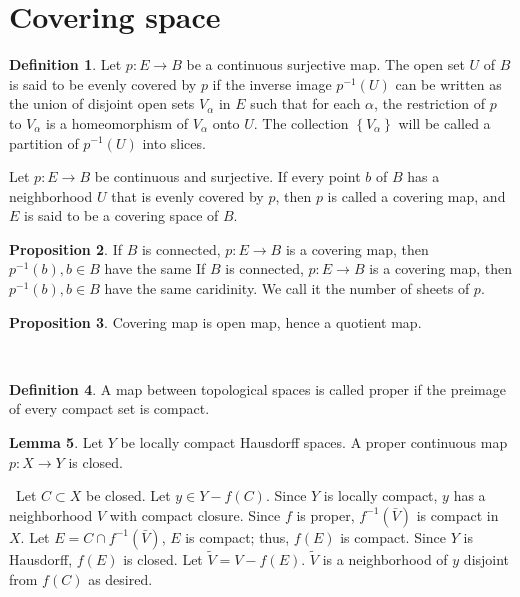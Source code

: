\documentclass[12pt,a4paper]{book}
\newenvironment{prooff}{{\noindent\it\textcolor{cyan!40!black}{Proof}:}\,}{\par}
\theoremstyle{definition}
\newtheorem{defn}{Definition}[section]
\newtheorem{lem}[defn]{Lemma}
\newtheorem{prop}[defn]{Proposition}
\begin{document}
\section{Covering space}
\begin{defn}
    Let $p: E \rightarrow B$ be a continuous surjective map. The open set $U$ of $B$ is said to be evenly covered by $p$ if the inverse image $p^{-1}(U)$ can be written as the union of disjoint open sets $V_\alpha$ in $E$ such that for each $\alpha$, the restriction of $p$ to $V_\alpha$ is a homeomorphism of $V_\alpha$ onto $U$. The collection $\left\{V_\alpha\right\}$ will be called a partition of $p^{-1}(U)$ into slices.

    Let $p: E \rightarrow B$ be continuous and surjective. If every point $b$ of $B$ has a neighborhood $U$ that is evenly covered by $p$, then $p$ is called a covering map, and $E$ is said to be a covering space of $B$.
\end{defn}
\begin{prop}
    If $B$ is connected, $p:E\rightarrow B$ is a covering map, then $p^{-1}(b),b\in B$ have the same  If $B$ is connected, $p:E\rightarrow B$ is a covering map, then $p^{-1}(b),b\in B$ have the same caridinity. We call it the number of sheets of $p$.
\end{prop}
\begin{prop}
    Covering map is open map, hence a quotient map.
\end{prop}
\begin{prooff}

\end{prooff}
\begin{defn}
    A map between topological spaces is called proper if the preimage of every compact set is compact.
\end{defn}
\begin{lem}
    Let $Y$ be locally compact Hausdorff spaces. A proper continuous map $p: X \rightarrow Y$ is closed.
    \label{lemma:proper continuous, closed}
\end{lem}
\begin{prooff}
    Let $C \subset X$ be closed. Let $y \in Y-f(C)$.
    Since $Y$ is locally compact, $y$ has a neighborhood $V$ with compact closure.
    Since $f$ is proper, $f^{-1}(\bar{V})$ is compact in $X$.
    Let $E=C \cap f^{-1}(\bar{V})$, $E$ is compact; thus, $f(E)$ is compact.
    Since $Y$ is Hausdorff, $f(E)$ is closed. Let $\tilde{V}=V-f(E)$. $\tilde{V}$ is a neighborhood of $y$ disjoint from $f(C)$ as desired.
\end{prooff}
\end{document}
